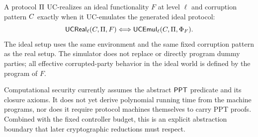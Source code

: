 \begin{definition}[UC realization]
\label{def:uc-realization}
\leanok
A protocol \(\Pi\) UC-realizes an ideal functionality \(F\) at level
\(\ell\) and corruption pattern \(C\) exactly when it UC-emulates the
generated ideal protocol:
\[
  \mathsf{UCReal}_\ell(C,\Pi,F)
  \Longleftrightarrow
  \mathsf{UCEmul}_\ell(C,\Pi,\Phi_F).
\]
The ideal setup uses the same environment and the same fixed corruption pattern
as the real setup.  The simulator does not replace or directly program dummy
parties; all effective corrupted-party behavior in the ideal world is defined
by the program of \(F\).
\end{definition}

\begin{remark}
\label{rem:uc-computational-boundary}
Computational security currently assumes the abstract \(\mathsf{PPT}\) predicate and
its closure axioms.  It does not yet derive polynomial running time from the
machine programs, nor does it require protocol machines themselves to carry
PPT proofs.  Combined with the fixed controller budget, this is an explicit
abstraction boundary that later cryptographic reductions must respect.
\end{remark}
